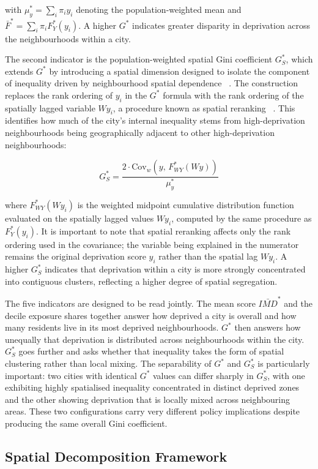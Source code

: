 \documentclass[11pt,journal,compsoc]{IEEEtran}
\begin{document}
with $\mu^*_y = \sum_i \pi_i y_i$ denoting the population-weighted mean and $\bar{F}^* = \sum_i \pi_i F^*_Y(y_i)$. A higher $G^*$ indicates greater disparity in deprivation across the neighbourhoods within a city.

The second indicator is the population-weighted spatial Gini coefficient $G^*_S$, which extends $G^*$ by introducing a spatial dimension designed to isolate the component of inequality driven by neighbourhood spatial dependence ~\cite[Eq.~12]{panzera2020measuring}. The construction replaces the rank ordering of $y_i$ in the $G^*$ formula with the rank ordering of the spatially lagged variable $Wy_i$, a procedure known as spatial reranking ~\cite{dawkins2007spatial}. This identifies how much of the city's internal inequality stems from high-deprivation neighbourhoods being geographically adjacent to other high-deprivation neighbourhoods:

$$G^*_S = \frac{2 \cdot \text{Cov}_w\!\left(y,\, F^*_{WY}(Wy)\right)}{\mu^*_y}$$

where $F^*_{WY}(Wy_i)$ is the weighted midpoint cumulative distribution function evaluated on the spatially lagged values $Wy_i$, computed by the same procedure as $F^*_Y(y_i)$. It is important to note that spatial reranking affects only the rank ordering used in the covariance; the variable being explained in the numerator remains the original deprivation score $y_i$ rather than the spatial lag $Wy_i$. A higher $G^*_S$ indicates that deprivation within a city is more strongly concentrated into contiguous clusters, reflecting a higher degree of spatial segregation.

The five indicators are designed to be read jointly. The mean score $\bar{IMD}^*$ and the decile exposure shares together answer how deprived a city is overall and how many residents live in its most deprived neighbourhoods. $G^*$ then answers how unequally that deprivation is distributed across neighbourhoods within the city. $G^*_S$ goes further and asks whether that inequality takes the form of spatial clustering rather than local mixing. The separability of $G^*$ and $G^*_S$ is particularly important: two cities with identical $G^*$ values can differ sharply in $G^*_S$, with one exhibiting highly spatialised inequality concentrated in distinct deprived zones and the other showing deprivation that is locally mixed across neighbouring areas. These two configurations carry very different policy implications despite producing the same overall Gini coefficient.

\subsection{Spatial Decomposition Framework}
\end{document}
